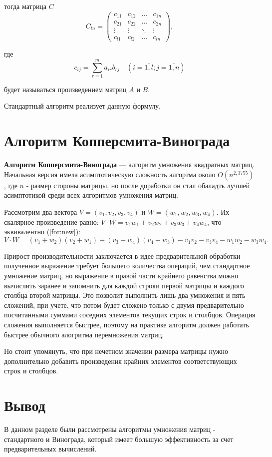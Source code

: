 тогда матрица $C$
\begin{equation}
	C_{ln} = \begin{pmatrix}
		c_{11} & c_{12} & \ldots & c_{1n}\\
		c_{21} & c_{22} & \ldots & c_{2n}\\
		\vdots & \vdots & \ddots & \vdots\\
		c_{l1} & c_{l2} & \ldots & c_{ln}
	\end{pmatrix},
\end{equation}

где
\begin{equation}
	\label{eq:M}
	c_{ij} =
	\sum_{r=1}^{m} a_{ir}b_{rj} \quad (i=\overline{1,l}; j=\overline{1,n})
\end{equation}

будет называться произведением матриц $A$ и $B$.

Стандартный алгоритм реализует данную формулу.


\section{Алгоритм Копперсмита-Винограда}

\textbf{Алгоритм Копперсмита-Винограда} \cite{vinograd_matrix} — алгоритм умножения квадратных матриц. Начальная версия имела асимптотическую сложность алгортма около $O(n^{2,3755})$, где $n$ - размер стороны матрицы, но после доработки он стал обаладть лучшей асимптотикой среди всех алгоритмов умножения матриц.

Рассмотрим два вектора $V = (v_1, v_2, v_3, v_4)$ и $W = (w_1, w_2, w_3, w_4)$.
Их скалярное произведение равно: $V \cdot W = v_1w_1 + v_2w_2 + v_3w_3 + v_4w_4$, что эквивалентно (\ref{for:new}):
\begin{equation}
	\label{for:new}
	V \cdot W = (v_1 + w_2)(v_2 + w_1) + (v_3 + w_4)(v_4 + w_3) - v_1v_2 - v_3v_4 - w_1w_2 - w_3w_4.
\end{equation}

Прирост производительности заключается в идее предварительной обработки - полученное выражение требует большего количества операций, чем стандартное умножение матриц, но выражение в правой части крайнего равенства можно вычислить заранее и запомнить для каждой строки первой матрицы и каждого столбца второй матрицы. 
Это позволит выполнить лишь два умножения и пять сложений, при учете, что потом будет сложено только с двумя предварительно посчитанными суммами соседних элементов текущих строк и столбцов. Операция сложения выполняется быстрее, поэтому на практике алгоритм должен работать быстрее обычного алогритма перемножения матриц.

Но стоит упомянуть, что при нечетном значении размера матрицы нужно дополнительно добавить произведения крайних элементов соответствующих строк и столбцов.


\section*{Вывод}

В данном разделе были рассмотрены алгоритмы умножения матриц - стандартного и Винограда, который имеет большую эффективность за счет предварительных вычислений.



